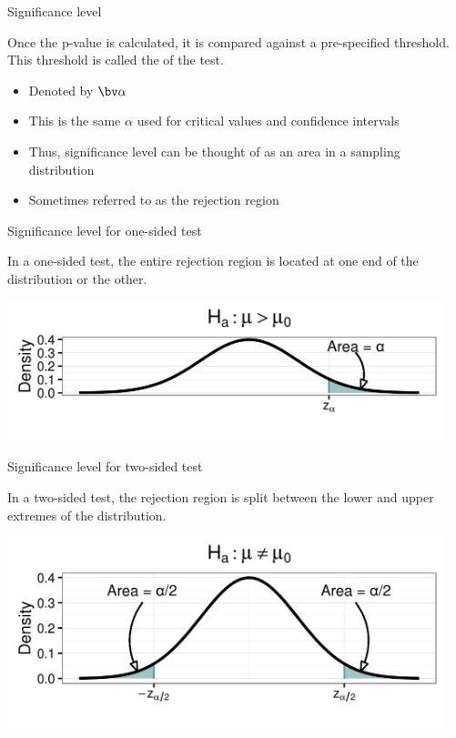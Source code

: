 \documentclass[xcolor=table, aspectratio=169, bigger]{beamer}
\begin{document}
\begin{frame}{Significance level}
\begin{block}{}
Once the p-value is calculated, it is compared against a pre-specified threshold. This threshold is called the  of the test.
\begin{itemize}
\pause\item Denoted by $\bv \alpha$
\pause\item This is the same $\alpha$ used for critical values and confidence intervals
\pause\item Thus, significance level can be thought of as an area in a sampling distribution
\pause\item Sometimes referred to as the rejection region
\end{itemize}
\end{block}
\end{frame}

\begin{frame}{Significance level for one-sided test}
\begin{block}{}
In a one-sided test, the entire rejection region is located at one end of the distribution or the other.
\end{block}

\bigskip

{\centering
\includegraphics[width=5in]{../images/wk08_sig_up}
\par}
\end{frame}

\begin{frame}{Significance level for two-sided test}
\begin{block}{}
In a two-sided test, the rejection region is split between the lower and upper extremes of the distribution.
\end{block}
\bigskip
{\centering
\includegraphics[width=5in]{../images/wk08_sig_2}
\par}

\end{frame}
\end{document}
